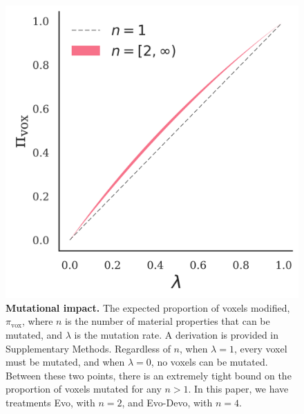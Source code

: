 \begin{figure}
\centering
\includegraphics[width=0.5\linewidth]{Chapter04/FigS4}
\caption{\label{fig:S4}\textbf{Mutational impact.} The expected proportion of voxels modified, $\pi_{\text{vox}}$, where $n$ is the number of material properties that can be mutated, and $\lambda$ is the mutation rate.
A derivation is provided in Supplementary Methods.
Regardless of $n$,
when $\lambda=1$, every voxel must be mutated, and when $\lambda=0$, no voxels can be mutated. 
Between these two points, there is an extremely tight bound on the proportion of voxels mutated for any $n>1$. 
In this paper, we have treatments Evo, with $n=2$, and Evo-Devo, with $n=4$.
}
\end{figure}




